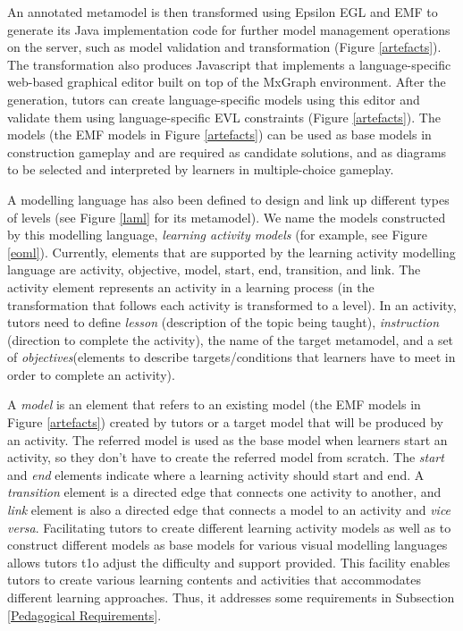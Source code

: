 \documentclass[10pt, a4paper]{report} \usepackage[titletoc]{appendix}
\begin{document}
An annotated metamodel is then transformed using Epsilon EGL \cite{kolovos2010epsilon} and EMF \cite{steinberg2008emf} to generate its Java implementation code for further model management operations on the server, such as model validation and transformation (Figure \ref{artefacts}). The transformation also produces Javascript that implements a language-specific web-based graphical editor built on top of the MxGraph environment. After the generation, tutors can create language-specific models using this editor and validate them using language-specific EVL \cite{kolovos2006eclipse} constraints (Figure \ref{artefacts}). The models (the EMF models in Figure \ref{artefacts}) can be used as base models in construction gameplay and are required as candidate solutions, and as diagrams to be selected and interpreted by learners in multiple-choice gameplay. 

A modelling language has also been defined to design and link up different types of levels (see Figure \ref{laml} for its metamodel). We name the models constructed by this modelling language, \emph{learning activity models} (for example, see Figure \ref{eoml}). Currently, elements that are supported by the learning activity modelling language are activity, objective, model, start, end, transition, and link. The activity element represents an activity in a learning process (in the transformation that follows each activity is transformed to a level). In an activity, tutors need to define \emph{lesson} (description of the topic being taught), \emph{instruction} (direction to complete the activity), the name of the target metamodel, and a set of \emph{objectives}(elements to describe targets/conditions that learners have to meet in order to complete an activity). 

A \emph{model} is an element that refers to an existing model (the EMF models in Figure \ref{artefacts}) created by tutors or a target model that will be produced by an activity. The referred model is used as the base model when learners start an activity, so they don't have to create the referred model from scratch. The \emph{start} and \emph{end} elements indicate where a learning activity should start and end. A \emph{transition} element is a directed edge that connects one activity to another, and \emph{link} element is also a directed edge that connects a model to an activity and \textit{vice versa}. Facilitating tutors to create different learning activity models as well as to construct different models as base models for various visual modelling languages allows tutors t1o adjust the difficulty and support provided. This facility enables tutors to create various learning contents and activities that accommodates different learning approaches. Thus, it addresses some requirements in Subsection \ref{Pedagogical Requirements}.
\end{document}

